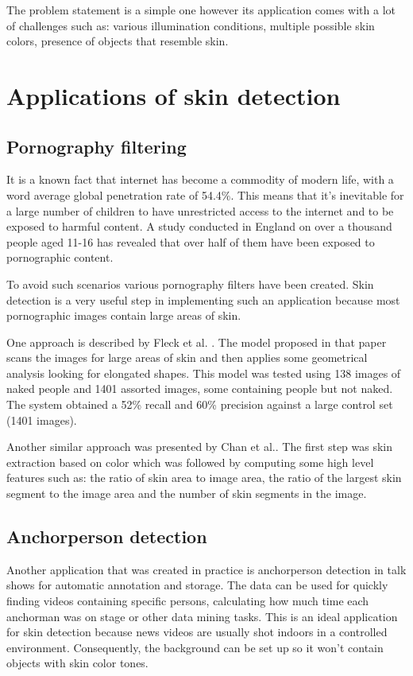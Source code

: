 \documentclass[12pt]{report}
\begin{document}
	The problem statement is a simple one however its application comes with a lot of challenges such as: various illumination conditions, multiple possible skin colors, presence of objects that resemble skin.
	
	\section{Applications of skin detection}
	
	\subsection{Pornography filtering}
	It is a known fact that internet has become a commodity of modern life, with a word average global penetration rate of 54.4\%\cite{internet_stats}. This means that it's inevitable for a large number of children to have unrestricted access to the internet and to be exposed to harmful content. A study conducted in England\cite{children_exposure} on over a thousand people aged 11-16 has revealed that over half of them have been exposed to pornographic content. 
	
	To avoid such scenarios various pornography filters have been created. Skin detection is a very useful step in implementing such an application because most pornographic images contain large areas of skin.
	
	One approach is described by Fleck et al. \cite{finding_naked_people}. The model proposed in that paper scans the images for large areas of skin and then applies some geometrical analysis looking for elongated shapes. This model was tested using 138 images of naked people and 1401 assorted images, some containing people but not naked. The system obtained a 52\% recall and 60\% precision against a large control set (1401 images).
	
	Another similar approach was presented by Chan et al.\cite{pornography_filter_with_ratios}. The first step was skin extraction based on color which was followed by computing some high level features such as: the ratio of skin area to image area, the ratio of the largest skin segment to the image area and the number of skin segments in the image.
	
	\subsection{Anchorperson detection}
	Another application that was created in practice is anchorperson detection in talk shows \cite{anchor_person_detection} for automatic annotation and storage. The data can be used for quickly finding videos containing specific persons, calculating how much time each anchorman was on stage or other data mining tasks. This is an ideal application for skin detection because news videos are usually shot indoors in a controlled environment. Consequently, the background can be set up so it won't contain objects with skin color tones.
	
\end{document}
